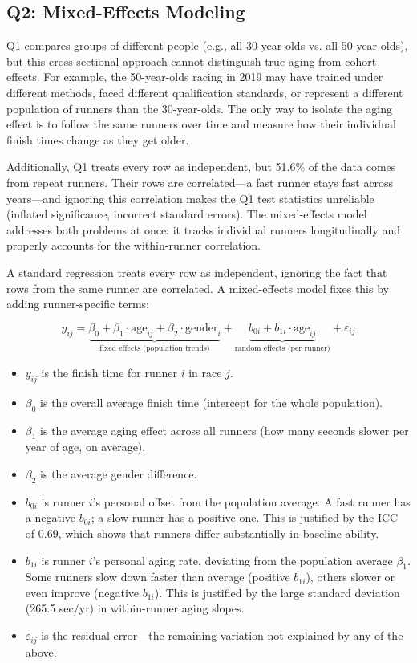 \documentclass[conference]{IEEEtran}
\begin{document}
\subsection{Q2: Mixed-Effects Modeling}

Q1 compares groups of different people (e.g., all 30-year-olds vs. all 50-year-olds), but this cross-sectional approach cannot distinguish true aging from cohort effects. For example, the 50-year-olds racing in 2019 may have trained under different methods, faced different qualification standards, or represent a different population of runners than the 30-year-olds. The only way to isolate the aging effect is to follow the same runners over time and measure how their individual finish times change as they get older.

Additionally, Q1 treats every row as independent, but 51.6\% of the data comes from repeat runners. Their rows are correlated---a fast runner stays fast across years---and ignoring this correlation makes the Q1 test statistics unreliable (inflated significance, incorrect standard errors). The mixed-effects model addresses both problems at once: it tracks individual runners longitudinally and properly accounts for the within-runner correlation.

A standard regression treats every row as independent, ignoring the fact that rows from the same runner are correlated. A mixed-effects model fixes this by adding runner-specific terms:

\[
y_{ij} = \underbrace{\beta_0 + \beta_1 \cdot \text{age}_{ij} + \beta_2 \cdot \text{gender}_i}_{\text{fixed effects (population trends)}} + \underbrace{b_{0i} + b_{1i} \cdot \text{age}_{ij}}_{\text{random effects (per runner)}} + \varepsilon_{ij}
\]

\begin{itemize}
    \item $y_{ij}$ is the finish time for runner $i$ in race $j$.
    \item $\beta_0$ is the overall average finish time (intercept for the whole population).
    \item $\beta_1$ is the average aging effect across all runners (how many seconds slower per year of age, on average).
    \item $\beta_2$ is the average gender difference.
    \item $b_{0i}$ is runner $i$'s personal offset from the population average. A fast runner has a negative $b_{0i}$; a slow runner has a positive one. This is justified by the ICC of 0.69, which shows that runners differ substantially in baseline ability.
    \item $b_{1i}$ is runner $i$'s personal aging rate, deviating from the population average $\beta_1$. Some runners slow down faster than average (positive $b_{1i}$), others slower or even improve (negative $b_{1i}$). This is justified by the large standard deviation (265.5 sec/yr) in within-runner aging slopes.
    \item $\varepsilon_{ij}$ is the residual error---the remaining variation not explained by any of the above.
\end{itemize}
\end{document}

